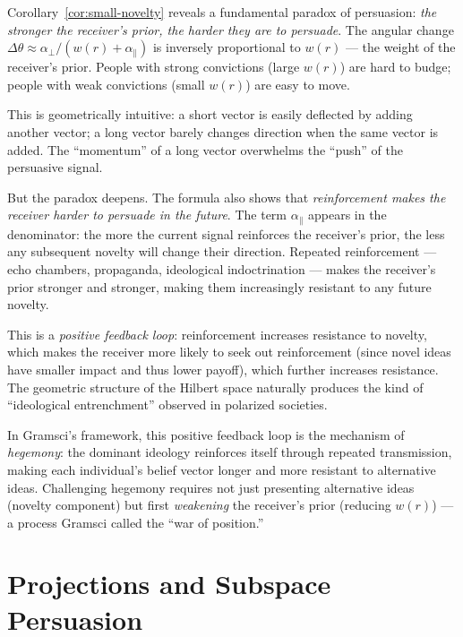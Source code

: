 \begin{interpretation}
\label{interp:persuasion-paradox}
Corollary~\ref{cor:small-novelty} reveals a fundamental paradox of persuasion:
\emph{the stronger the receiver's prior, the harder they are to persuade}. The
angular change $\Delta\theta \approx \alpha_\perp / (w(r) + \alpha_\parallel)$
is inversely proportional to $w(r)$ --- the weight of the receiver's prior.
People with strong convictions (large $w(r)$) are hard to budge; people with
weak convictions (small $w(r)$) are easy to move.

This is geometrically intuitive: a short vector is easily deflected by adding
another vector; a long vector barely changes direction when the same vector is
added. The ``momentum'' of a long vector overwhelms the ``push'' of the
persuasive signal.

But the paradox deepens. The formula also shows that \emph{reinforcement makes
the receiver harder to persuade in the future}. The term $\alpha_\parallel$
appears in the denominator: the more the current signal reinforces the receiver's
prior, the less any subsequent novelty will change their direction. Repeated
reinforcement --- echo chambers, propaganda, ideological indoctrination ---
makes the receiver's prior stronger and stronger, making them increasingly
resistant to any future novelty.

This is a \emph{positive feedback loop}: reinforcement increases resistance to
novelty, which makes the receiver more likely to seek out reinforcement (since
novel ideas have smaller impact and thus lower payoff), which further increases
resistance. The geometric structure of the Hilbert space naturally produces
the kind of ``ideological entrenchment'' observed in polarized societies.

In Gramsci's framework, this positive feedback loop is the mechanism of
\emph{hegemony}: the dominant ideology reinforces itself through repeated
transmission, making each individual's belief vector longer and more resistant
to alternative ideas. Challenging hegemony requires not just presenting
alternative ideas (novelty component) but first \emph{weakening} the
receiver's prior (reducing $w(r)$) --- a process Gramsci called the ``war of
position.''
\end{interpretation}


\section{Projections and Subspace Persuasion}

